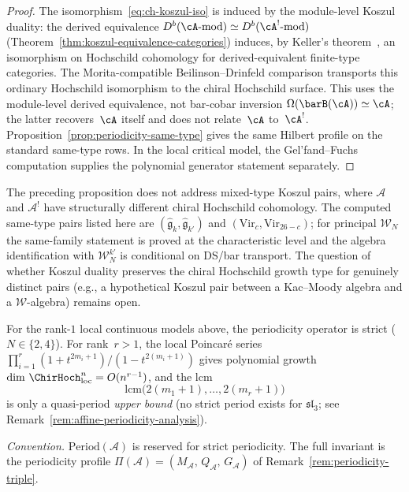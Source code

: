 \begin{proof}
The isomorphism~\eqref{eq:ch-koszul-iso} is induced by the module-level
Koszul duality: the derived equivalence
$D^b(\cA\text{-mod}) \simeq D^b(\cA^!\text{-mod})$
(Theorem~\ref{thm:koszul-equivalence-categories}) induces, by
Keller's theorem~\cite{Keller01}, an isomorphism on Hochschild
cohomology for derived-equivalent finite-type categories.  The
Morita-compatible Beilinson--Drinfeld comparison transports this
ordinary Hochschild isomorphism to the chiral Hochschild surface.
This uses the module-level derived equivalence, not bar-cobar
inversion $\Omega(\barB(\cA)) \simeq \cA$; the latter recovers~$\cA$
itself and does not relate~$\cA$ to~$\cA^!$.
Proposition~\ref{prop:periodicity-same-type} gives the same Hilbert
profile on the standard same-type rows.  In the local critical model,
the Gel'fand--Fuchs computation supplies the polynomial generator
statement separately.
\end{proof}

\begin{remark}\label{rem:periodicity-mixed-type}
The preceding proposition does not address mixed-type Koszul pairs, where $\mathcal{A}$ and $\mathcal{A}^!$ have structurally different chiral Hochschild cohomology. The computed same-type pairs listed here are $(\widehat{\mathfrak{g}}_k, \widehat{\mathfrak{g}}_{k'})$ and $(\mathrm{Vir}_c, \mathrm{Vir}_{26-c})$; for principal $\mathcal{W}_N$ the same-family statement is proved at the characteristic level and the algebra identification with $\mathcal{W}_N^{k'}$ is conditional on DS/bar transport. The question of whether Koszul duality preserves the chiral Hochschild growth type for genuinely distinct pairs (e.g., a hypothetical Koszul pair between a Kac--Moody algebra and a $\mathcal{W}$-algebra) remains open.
\end{remark}

\begin{remark}\label{rem:periodicity-profile}
For the rank-$1$ local continuous models above, the periodicity
operator is strict ($N \in \{2,4\}$). For rank~$r > 1$, the local
Poincar\'e series
$\prod_{i=1}^r (1 + t^{2m_i+1})/(1 - t^{2(m_i+1)})$
gives polynomial growth
$\dim\,\ChirHoch_{\mathrm{loc}}^n = O(n^{r-1})$, and the lcm
\[
\mathrm{lcm}\bigl(2(m_1{+}1), \ldots, 2(m_r{+}1)\bigr)
\]
is only a quasi-period \emph{upper bound} (no strict period exists for $\mathfrak{sl}_3$; see Remark~\ref{rem:affine-periodicity-analysis}).

\emph{Convention.} $\mathrm{Period}(\mathcal{A})$ is reserved for strict periodicity. The full invariant is the periodicity profile $\Pi(\mathcal{A}) = (M_{\mathcal{A}},\, Q_{\mathcal{A}},\, G_{\mathcal{A}})$ of Remark~\ref{rem:periodicity-triple}.
\end{remark}

